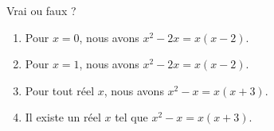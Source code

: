 
\begin{exercice}%
    \label{exosmath-0255}


Vrai ou faux ?
    \begin{enumerate}
        \item
            Pour \( x=0\), nous avons \( x^2-2x=x(x-2)\). 
        \item
            Pour \( x=1\), nous avons \( x^2-2x=x(x-2)\). 
        \item
            Pour tout réel \( x\), nous avons \( x^2-x=x(x+3)\). 
        \item
            Il existe un réel \( x\) tel que \( x^2-x=x(x+3)\). 
    \end{enumerate}

\end{exercice}
